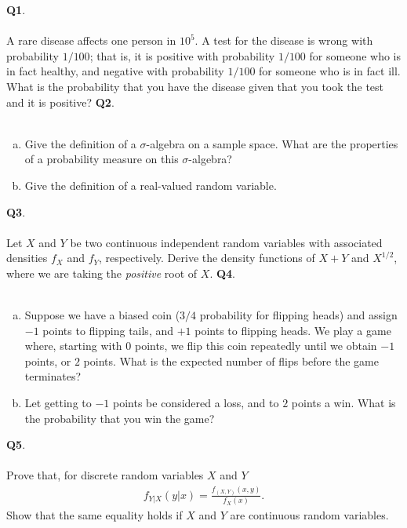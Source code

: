 \documentclass[12pt, oneside]{amsart}
\begin{document}
\vfill


\newpage
\noindent
\textbf{Q1}. \\ \\ 
A rare disease affects one person in $10^5$. A test for the disease
is wrong with probability $1/100$; that is, it is positive with probability
$1/100$ for someone who is in fact healthy, and negative
with probability $1/100$ for someone who is in fact ill. What is the probability
that you have the disease given that you took the test and it is positive?
\newpage
\noindent
\textbf{Q2}.\\ \\ 
\begin{enumerate}[(a)]
    \item Give the definition of a $\sigma$-algebra on a sample space. What are the properties of a probability measure on this $\sigma$-algebra? 
        \vspace{5in}
    \item Give the definition of a real-valued random variable.
\end{enumerate}

\newpage

\noindent
\textbf{Q3}. \\ \\ 

Let $X$ and $Y$ be two continuous independent random variables with associated densities $f_X$ and $f_Y$, respectively. Derive the density functions of $X+Y$ and $X^{1/2}$, where we are taking the \emph{positive} root of $X$.  
\newpage
\noindent
\textbf{Q4}. \\ \\ 
\noindent
\begin{enumerate}[(a)]
    \item
Suppose we have a biased coin ($3/4$ probability for flipping heads) and assign $-1$ points to flipping tails, and $+1$ points to
flipping heads. We play a game where, starting with $0$ points, we flip this coin repeatedly until we obtain $-1$ points, or $2$ points. What is the expected number of flips before the
game terminates? 
\vspace{4in}
\item Let getting to $-1$ points be considered a loss, and to $2$ points a win.
    What is the probability that you win the game? 
\end{enumerate}
\newpage
\noindent

\noindent \textbf{Q5}. \\ \\ 
\noindent
Prove that, for discrete random variables $X$ and $Y$ 
\begin{align*}
f_{Y|X}(y|x) = \frac{f_{(X,Y)}(x,y)}{f_X(x)}.
\end{align*}
Show that the same equality holds if $X$ and $Y$ are continuous random
variables.

\vspace{2in}
\end{document}
